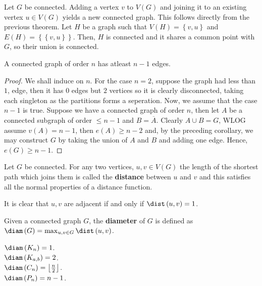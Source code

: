 \begin{corollary}
	Let $G$ be connected. Adding a vertex $v$ to $V\left( G \right) $ and joining it to an existing vertex $u \in V\left( G \right) $ yields a new connected graph. This follows directly from the previous theorem. Let $H$ be a graph such that $V\left( H \right)  = \left\{ v, u \right\} $ and $E\left( H \right)  = \left\{ \left\{ v, u \right\}  \right\} $. Then,  $H$ is connected and it shares a common point with $G$, so their union is connected.
\end{corollary}
\begin{theorem}
	A connected graph of order $n$ has atleast $n-1$ edges.
\end{theorem}
\begin{proof}
	We shall induce on $n$. For the case $n=2$, suppose the graph had less than $1$, edge, then it has $0$ edges but $2$ vertices so it is clearly disconnected, taking each singleton as the partitions forms a seperation.
	Now, we assume that the case  $n -1$ is true. Suppose we have a connected graph of order  $n$, then let $A$ be a connected subgraph of order $\le n-1$ and $B = \overline{A}$. Clearly $A \cup B = G$, WLOG assume $v\left( A \right)  = n-1$, then $e\left( A \right) \ge n-2$ and, by the preceding corollary, we may construct $G$ by taking the union  of $A$ and $B$ and adding one edge. Hence, $e\left( G \right) \ge n-1$.
\end{proof}
\begin{definition}[Distance]
	Let $G$ be connected. For any two vertices, $u, v \in V\left( G \right) $ the length of the shortest path which joins them is called the \textbf{distance} between $u$ and $v$ and this satisfies all the normal properties of a distance function.
\end{definition}
It is clear that $u, v$ are adjacent if and only if $\dist \left( u, v \right) = 1$.
 \begin{definition}[Diameter]
	 Given a connected graph $G$, the \textbf{diameter} of $G$ is defined as $\diam \left( G \right)  = \max _{u, v \in G} \dist \left( u, v \right) $.
\end{definition}
\begin{example}
	$\diam \left( K_{n} \right) = 1$.\\
	$\diam \left( K_{a, b} \right) = 2 $.\\
	$\diam \left( C_{n} \right) = \left\lfloor \frac{n}{2} \right\rfloor$.\\
	$\diam \left( P_{n} \right) = n-1$.\\
\end{example}
